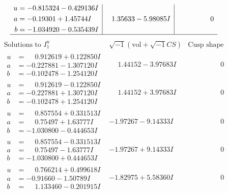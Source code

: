 \documentclass[1p]{elsarticle_modified}
\theoremstyle{definition}
\newcommand{\I}{\sqrt{-1}}
\begin{document}
$$\begin{array}{c|c|c}
\begin{aligned}
u &= -0.815324 - 0.429136 I \\
a &= -0.19301 + 1.45744 I \\
b &= -1.034920 - 0.535439 I\end{aligned}
 & \phantom{-}1.35633 - 5.98085 I & \phantom{-0.000000 } 0\\
 \hline 
 \end{array}$$\newpage$$\begin{array}{c|c|c}  
\text{Solutions to }I^u_{1}& \I (\text{vol} + \sqrt{-1}CS) & \text{Cusp shape}\\
 \hline 
\begin{aligned}
u &= \phantom{-}0.912619 + 0.122850 I \\
a &= -0.227881 - 1.307120 I \\
b &= -0.102478 - 1.254120 I\end{aligned}
 & \phantom{-}1.44152 - 3.97683 I & \phantom{-0.000000 } 0 \\ \hline\begin{aligned}
u &= \phantom{-}0.912619 - 0.122850 I \\
a &= -0.227881 + 1.307120 I \\
b &= -0.102478 + 1.254120 I\end{aligned}
 & \phantom{-}1.44152 + 3.97683 I & \phantom{-0.000000 } 0 \\ \hline\begin{aligned}
u &= \phantom{-}0.857554 + 0.331513 I \\
a &= \phantom{-}0.75497 + 1.63777 I \\
b &= -1.030800 - 0.444653 I\end{aligned}
 & -1.97267 - 9.14333 I & \phantom{-0.000000 } 0 \\ \hline\begin{aligned}
u &= \phantom{-}0.857554 - 0.331513 I \\
a &= \phantom{-}0.75497 - 1.63777 I \\
b &= -1.030800 + 0.444653 I\end{aligned}
 & -1.97267 + 9.14333 I & \phantom{-0.000000 } 0 \\ \hline\begin{aligned}
u &= \phantom{-}0.766214 + 0.499618 I \\
a &= -0.91660 - 1.50789 I \\
b &= \phantom{-}1.133460 - 0.201915 I\end{aligned}
 & -1.82975 + 5.58360 I & \phantom{-0.000000 } 0 \\ \hline\begin{aligned}

\end{aligned}
\end{array}$$
\end{document}
